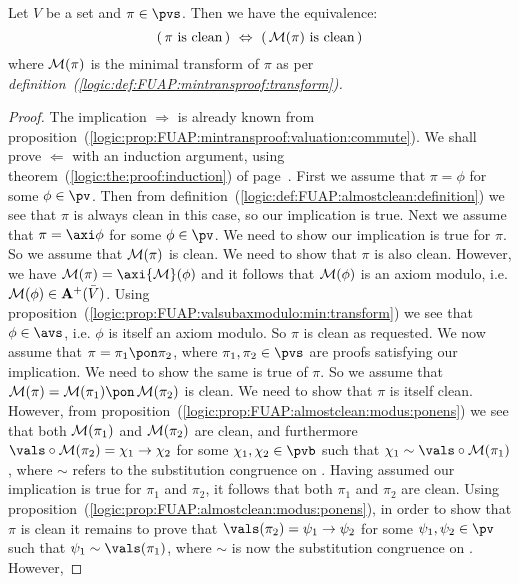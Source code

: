 \begin{prop}\label{logic:prop:FUAP:proofwithcleanMT:mintrans:clean:equivalence}
Let $V$ be a set and $\pi\in\pvs$. Then we have the equivalence:
    \[
    (\,\mbox{$\pi$ is clean}\,)\ \Leftrightarrow\ (\,\mbox{${\cal M}(\pi)$ is clean}\,)
    \]
where ${\cal M}(\pi)$ is the minimal transform of $\pi$ as per {\em
definition~(\ref{logic:def:FUAP:mintransproof:transform}).}
\end{prop}
\begin{proof}
The implication $\Rightarrow$ is already known from
proposition~(\ref{logic:prop:FUAP:mintransproof:valuation:commute}).
We shall prove $\Leftarrow$ with an induction argument, using
theorem~(\ref{logic:the:proof:induction}) of
page~\pageref{logic:the:proof:induction}. First we assume that
$\pi=\phi$ for some $\phi\in\pv$. Then from
definition~(\ref{logic:def:FUAP:almostclean:definition}) we see that
$\pi$ is always clean in this case, so our implication is true. Next
we assume that $\pi=\axi\phi$ for some $\phi\in\pv$. We need to show
our implication is true for $\pi$. So we assume that ${\cal M}(\pi)$
is clean. We need to show that $\pi$ is also clean. However, we have
${\cal M}(\pi)=\axi{\cal M}(\phi)$ and it follows that ${\cal
M}(\phi)$ is an axiom modulo, i.e. ${\cal M}(\phi)\in{\bf
A}^{+}(\bar{V})$. Using
proposition~(\ref{logic:prop:FUAP:valsubaxmodulo:min:transform}) we
see that $\phi\in\avs$, i.e. $\phi$ is itself an axiom modulo. So
$\pi$ is clean as requested. We now assume that
$\pi=\pi_{1}\pon\pi_{2}$, where $\pi_{1},\pi_{2}\in\pvs$ are proofs
satisfying our implication. We need to show the same is true of
$\pi$. So we assume that ${\cal M}(\pi)={\cal M}(\pi_{1})\pon\,{\cal
M}(\pi_{2})$ is clean. We need to show that $\pi$ is itself clean.
However, from
proposition~(\ref{logic:prop:FUAP:almostclean:modus:ponens}) we see
that both ${\cal M}(\pi_{1})$ and ${\cal M}(\pi_{2})$ are clean, and
furthermore $\vals\circ{\cal M}(\pi_{2})=\chi_{1}\to\chi_{2}$ for
some $\chi_{1},\chi_{2}\in\pvb$ such that
$\chi_{1}\sim\vals\circ{\cal M}(\pi_{1})$, where $\sim$ refers to
the substitution congruence on \pvb. Having assumed our implication
is true for $\pi_{1}$ and $\pi_{2}$, it follows that both $\pi_{1}$
and $\pi_{2}$ are clean. Using
proposition~(\ref{logic:prop:FUAP:almostclean:modus:ponens}), in
order to show that $\pi$ is clean it remains to prove that
$\vals(\pi_{2})=\psi_{1}\to\psi_{2}$ for some
$\psi_{1},\psi_{2}\in\pv$ such that $\psi_{1}\sim\vals(\pi_{1})$,
where $\sim$ is now the substitution congruence on \pv. However,

\end{proof}
